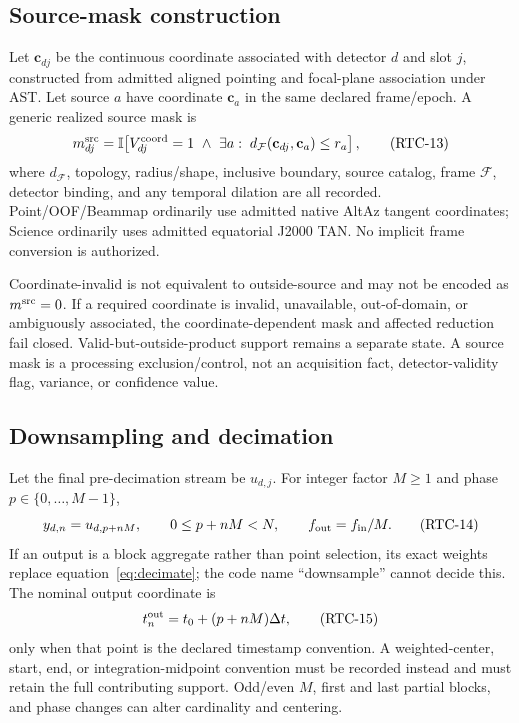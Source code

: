 \documentclass[11pt]{article}
\begin{document}
\subsection{Source-mask construction}

Let $\mathbf c_{dj}$ be the continuous coordinate associated with detector
$d$ and slot $j$, constructed from admitted aligned pointing and focal-plane
association under AST.  Let source $a$ have coordinate $\mathbf c_a$ in the
same declared frame/epoch.  A generic realized source mask is
\begin{equation}
 m^{\rm src}_{dj}=
 \mathbb I\!\left[
 V^{\rm coord}_{dj}=1\ \land\
 \exists a:\;d_{\mathcal F}(\mathbf c_{dj},\mathbf c_a)
     \le r_a
 \right],
 \tag{RTC-13}\label{eq:sourcemask}
\end{equation}
where $d_{\mathcal F}$, topology, radius/shape, inclusive boundary, source
catalog, frame $\mathcal F$, detector binding, and any temporal dilation are
all recorded.  Point/OOF/Beammap ordinarily use admitted native AltAz
tangent coordinates; Science ordinarily uses admitted equatorial J2000 TAN.
No implicit frame conversion is authorized.

Coordinate-invalid is not equivalent to outside-source and may not be encoded
as $m^{\rm src}=0$.  If a required coordinate is invalid, unavailable,
out-of-domain, or ambiguously associated, the coordinate-dependent mask and
affected reduction fail closed.  Valid-but-outside-product support remains a
separate state.  A source mask is a processing exclusion/control, not an
acquisition fact, detector-validity flag, variance, or confidence value.

\subsection{Downsampling and decimation}

Let the final pre-decimation stream be $u_{d,j}$.  For integer factor $M\ge1$
and phase $p\in\{0,\ldots,M-1\}$,
\begin{equation}
 y_{d,n}=u_{d,p+nM},\qquad
 0\le p+nM<N,\qquad f_{\rm out}=f_{\rm in}/M.
 \tag{RTC-14}\label{eq:decimate}
\end{equation}
If an output is a block aggregate rather than point selection, its exact
weights replace equation~\eqref{eq:decimate}; the code name
``downsample'' cannot decide this.  The nominal output coordinate is
\begin{equation}
 t^{\rm out}_n=t_0+(p+nM)\Delta t,
 \tag{RTC-15}\label{eq:outtime}
\end{equation}
only when that point is the declared timestamp convention.  A weighted-center,
start, end, or integration-midpoint convention must be recorded instead and
must retain the full contributing support.  Odd/even $M$, first and last
partial blocks, and phase changes can alter cardinality and centering.
\end{document}
